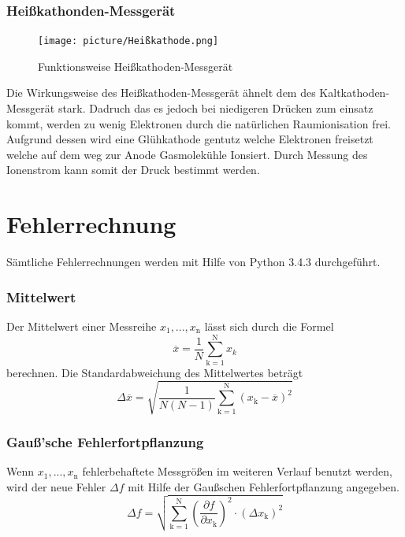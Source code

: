 \subsubsection{Heißkathonden-Messgerät}
\begin{figure}
  \vspace{-1.0cm}
  \centering
  \texttt{[image: picture/Heißkathode.png]}
  \caption{Funktionsweise Heißkathoden-Messgerät}
  \label{fig:Heißkathode}
  \vspace{-1cm}
\end{figure}
Die Wirkungsweise des Heißkathoden-Messgerät ähnelt dem des Kaltkathoden-Messgerät stark. Dadruch das es jedoch bei niedigeren Drücken zum einsatz kommt, werden zu wenig Elektronen durch die natürlichen Raumionisation frei. Aufgrund dessen wird eine Glühkathode gentutz welche Elektronen freisetzt welche auf dem weg zur Anode Gasmolekühle Ionsiert. Durch Messung des Ionenstrom kann somit der Druck bestimmt werden.  
\section{Fehlerrechnung}
Sämtliche Fehlerrechnungen werden mit Hilfe von Python 3.4.3 durchgeführt.
\subsubsection{Mittelwert}
Der Mittelwert einer Messreihe $x_\text{1}, ... ,x_\text{n}$ lässt sich durch die Formel
\begin{equation}
	\overline{x} = \frac{1}{N} \sum_{\text{k}=1}^\text{N} x_k
	\label{eqn:ave}
\end{equation}
berechnen. Die Standardabweichung des Mittelwertes beträgt
\begin{equation}
	\Delta \overline{x} = \sqrt{ \frac{1}{N(N-1)} \sum_{\text{k}=1}^\text{N} (x_\text{k} - \overline{x})^2}
	\label{eqn:std}
\end{equation}

\subsubsection{Gauß'sche Fehlerfortpflanzung}
Wenn $x_\text{1}, ..., x_\text{n}$ fehlerbehaftete Messgrößen im weiteren Verlauf benutzt werden, wird der neue Fehler $\Delta f$ mit Hilfe der Gaußschen Fehlerfortpflanzung angegeben.
\begin{equation}
	\Delta f = \sqrt{\sum_{\text{k}=1}^\text{N} \left( \frac{ \partial f}{\partial x_\text{k}} \right) ^2 \cdot (\Delta x_\text{k})^2}
	\label{eqn:var}
\end{equation}

